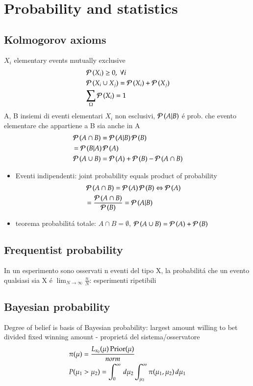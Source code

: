 \documentclass[main.tex]{subfiles}
\begin{document}
\chapter{Probability and statistics}

\section{Kolmogorov axioms}
$X_i$ elementary events mutually exclusive
\begin{align*}
&\operatorname{\mathcal{P}}{(X_i)}\geq0,\ \forall i\\
&\operatorname{\mathcal{P}}{(X_i\cup X_j)}=\operatorname{\mathcal{P}}{(X_i)}+\operatorname{\mathcal{P}}{(X_j)}\\
&\sum_{\Omega}\operatorname{\mathcal{P}}{(X_i)}=1
\end{align*}
A, B insiemi di eventi elementari $X_i$ non esclusivi, $\operatorname{\mathcal{P}}{(A|B)}$ \'e prob. che evento elementare che appartiene a B sia anche in A
\begin{align*}
&\operatorname{\mathcal{P}}{(A\cap B)}=\operatorname{\mathcal{P}}{(A|B)}\operatorname{\mathcal{P}}{(B)}\\
&=\operatorname{\mathcal{P}}{(B|A)}\operatorname{\mathcal{P}}{(A)}\\
&\operatorname{\mathcal{P}}{(A\cup B)}=\operatorname{\mathcal{P}}{(A)}+\operatorname{\mathcal{P}}{(B)}-\operatorname{\mathcal{P}}{(A\cap B)} 
\end{align*}
\begin{itemize}
\item Eventi indipendenti: joint probability equals product of probability
\begin{align*}
&\operatorname{\mathcal{P}}{(A\cap B)}=\operatorname{\mathcal{P}}{(A)}\operatorname{\mathcal{P}}{(B)}\Leftrightarrow \operatorname{\mathcal{P}}{(A)}\\
&=\frac{\operatorname{\mathcal{P}}{(A\cap B)}}{\operatorname{\mathcal{P}}{(B)}}=\operatorname{\mathcal{P}}{(A|B)}
\end{align*}
\item teorema probabilit\'a totale: $A\cap B=\emptyset$, $\operatorname{\mathcal{P}}{(A\cup B)}=\operatorname{\mathcal{P}}{(A)}+\operatorname{\mathcal{P}}{(B)}$
\end{itemize}

\section{Frequentist probability}

In un esperimento sono osservati n eventi del tipo X, la probabilit\'a che un evento qualsiasi sia X \'e $\lim_{N\to\infty}\frac{n}{N}$: esperimenti ripetibili

\section{Bayesian probability}

Degree of belief is basis of Bayesian probability: largest amount willing to bet divided fixed winning amount - propriet\'a del sistema/osservatore
\begin{align*}
&\pi(\mu)=\frac{L_{x_0}(\mu)\operatorname{Prior}(\mu)}{norm}\\
&P(\mu_1>\mu_2)=\int_0^{\infty}\,d\mu_2\int_{\mu_2}^{\infty}\pi(\mu_1,\mu_2)\,d\mu_1
\end{align*}
\end{document}
